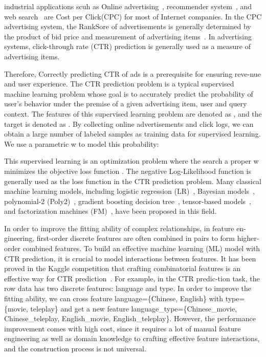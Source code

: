 \documentclass[journal]{IEEEtran}
\begin{document}
 industrial applications scuh as Online advertising~\cite{66,67}, recommender system~\cite{68}, and web search~\cite{69,70} are Cost per Click(CPC) for most of Internet companies. In the CPC advertising system, the RankSore of advertisements is generally determined by the product of bid price and measurement of advertising items~\cite{1}. In advertising systems, click-through rate (CTR) prediction is generally used as a measure of advertising items. 

Therefore, Correctly predicting CTR of ads is a prerequisite for ensuring reve-nue and user experience. The CTR prediction problem is a typical supervised machine learning problem whose goal is to accurately predict the probability of user’s behavior under the premise of a given advertising item, user and query context. The features of this supervised learning problem are denoted as , and the target is denoted as . By collecting online advertisements and click logs, we can obtain a large number of labeled samples  as training data for supervised learning. We use a parametric w to model this probability:

This supervised learning is an optimization problem where the search a proper w minimizes the objective loss function . The negative Log-Likelihood function is generally used as the loss function in the CTR prediction problem. Many classical machine learning models, including logistic regression (LR)~\cite{8}, Bayesian models~\cite{9}, polynomial-2 (Poly2)~\cite{6}, gradient boosting decision tree~\cite{12, 46, 47}, tensor-based models~\cite{57}, and factorization machines (FM)~\cite{13,37,14,15}, have been proposed in this field.

In order to improve the fitting ability of complex relationships, in feature en-gineering, first-order discrete features are often combined in pairs to form higher-order combined features. To build an effective machine learning (ML) model with CTR prediction, it is crucial to model interactions between features. It has been proved in the Kaggle competition that crafting combinatorial features is an effective way for CTR prediction~\cite{7,17,44,29}. For example, in the CTR predic-tion task, the row data has two discrete features: language and type. In order to improve the fitting ability, we can cross feature language=\{Chinese, English\} with type=\{movie, teleplay\} and get a new feature language\_type=\{Chinese\_movie, Chinese\_teleplay, English\_movie, English\_teleplay\}. However, the performance improvement comes with high cost, since it requires a lot of manual feature engineering as well as domain knowledge to crafting effective feature interactions, and the construction process is not universal.
\end{document}
